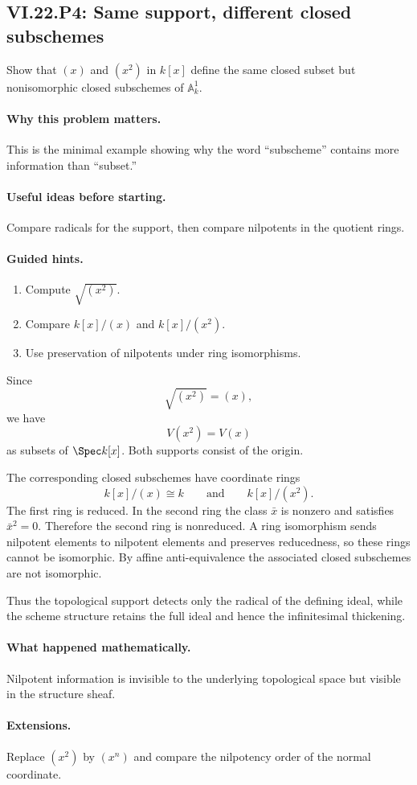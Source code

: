 \subsection*{VI.22.P4: Same support, different closed subschemes}
\begin{problem}\label{prob:vi22-p04}
Show that $(x)$ and $(x^2)$ in $k[x]$ define the same closed subset but nonisomorphic closed subschemes of $\mathbb A^1_k$.
\end{problem}

\ifdefined\FullProblemDossiers
\paragraph{Why this problem matters.}
This is the minimal example showing why the word ``subscheme'' contains more information than ``subset.''

\paragraph{Useful ideas before starting.}
Compare radicals for the support, then compare nilpotents in the quotient rings.

\paragraph{Guided hints.}
\begin{enumerate}
\item Compute $\sqrt{(x^2)}$.
\item Compare $k[x]/(x)$ and $k[x]/(x^2)$.
\item Use preservation of nilpotents under ring isomorphisms.
\end{enumerate}

\begin{solution}
Since
\[
 \sqrt{(x^2)}=(x),
\]
we have
\[
 V(x^2)=V(x)
\]
as subsets of $\Spec k[x]$.  Both supports consist of the origin.

The corresponding closed subschemes have coordinate rings
\[
 k[x]/(x)\cong k
 \qquad\text{and}\qquad
 k[x]/(x^2).
\]
The first ring is reduced.  In the second ring the class $\bar x$ is nonzero and satisfies
$\bar x^2=0$.  Therefore the second ring is nonreduced.  A ring isomorphism sends nilpotent
elements to nilpotent elements and preserves reducedness, so these rings cannot be isomorphic.
By affine anti-equivalence the associated closed subschemes are not isomorphic.

Thus the topological support detects only the radical of the defining ideal, while the scheme
structure retains the full ideal and hence the infinitesimal thickening.
\end{solution}

\paragraph{What happened mathematically.}
Nilpotent information is invisible to the underlying topological space but visible in the structure sheaf.

\paragraph{Extensions.}
Replace $(x^2)$ by $(x^n)$ and compare the nilpotency order of the normal coordinate.
\fi

